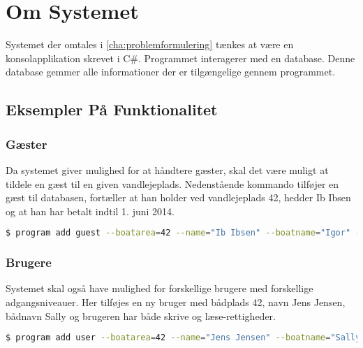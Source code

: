 \section{Om Systemet}
\label{sec:om_systemet}



Systemet der omtales i \cref{cha:problemformulering} tænkes at være en konsolapplikation skrevet i C\#. Programmet interagerer med en database. Denne database gemmer alle informationer der er tilgængelige gennem programmet.

\subsection{Eksempler På Funktionalitet}
\label{sub:eksempler_p_kommandoer}

\subsubsection{Gæster}
\label{ssub:Gaster}


Da systemet giver mulighed for at håndtere gæster, skal det være muligt at tildele en gæst til en given vandlejeplads. Nedenstående kommando tilføjer en gæst til databasen, fortæller at han holder ved vandlejeplads 42, hedder Ib Ibsen og at han har betalt indtil 1. juni 2014.

\begin{lstlisting}[language=bash, label={lst:add_guest}] 
  $ program add guest --boatarea=42 --name="Ib Ibsen" --boatname="Igor" --paiduntil="1/6/2014" 
\end{lstlisting}

\subsubsection{Brugere}
\label{ssub:brugere}

Systemet skal også have mulighed for forskellige brugere med forskellige adgangsniveauer. Her tilføjes en ny bruger med bådplads 42, navn Jens Jensen, bådnavn Sally og brugeren har både skrive og læse-rettigheder.


\begin{lstlisting}[language=bash, label={lst:add_user}] 
  $ program add user --boatarea=42 --name="Jens Jensen" --boatname="Sally" --access="w,r"
\end{lstlisting}


